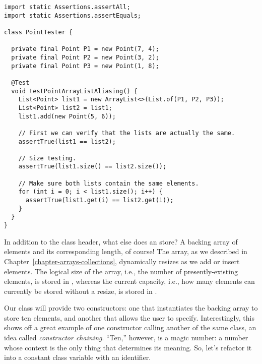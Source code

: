 \begin{lstlisting}[language=MyJava]
import static Assertions.assertAll;
import static Assertions.assertEquals;

class PointTester {

  private final Point P1 = new Point(7, 4);
  private final Point P2 = new Point(3, 2);
  private final Point P3 = new Point(1, 8);

  @Test
  void testPointArrayListAliasing() {
    List<Point> list1 = new ArrayList<>(List.of(P1, P2, P3));
    List<Point> list2 = list1;
    list1.add(new Point(5, 6));

    // First we can verify that the lists are actually the same.
    assertTrue(list1 == list2);

    // Size testing.
    assertTrue(list1.size() == list2.size());

    // Make sure both lists contain the same elements.
    for (int i = 0; i < list1.size(); i++) {
      assertTrue(list1.get(i) == list2.get(i));
    }
  }
}
\end{lstlisting}


In addition to the class header, what else does an  store? A backing array of elements and its corresponding length, of course! The array, as we described in Chapter~\ref{chapter-arrays-collections}, dynamically resizes as we add or insert elements. The logical size of the array, i.e., the number of presently-existing elements, is stored in , whereas the current capacity, i.e., how many elements can currently be stored without a resize, is stored in . 

Our class will provide two constructors: one that instantiates the backing array to store ten elements, and another that allows the user to specify. Interestingly, this shows off a great example of one constructor calling another of the same class, an idea called \emph{constructor chaining}. ``Ten,'' however, is a magic number: a number whose context is the only thing that determines its meaning. So, let's refactor it into a constant class variable with an identifier.

